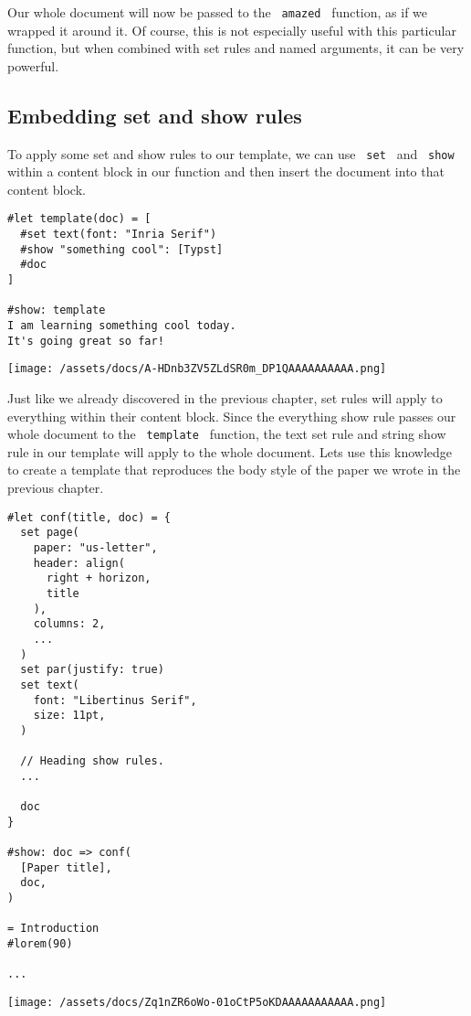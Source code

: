 Our whole document will now be passed to the \texttt{\ amazed\ }
function, as if we wrapped it around it. Of course, this is not
especially useful with this particular function, but when combined with
set rules and named arguments, it can be very powerful.

\subsection{Embedding set and show rules}\label{set-and-show-rules}

To apply some set and show rules to our template, we can use
\texttt{\ set\ } and \texttt{\ show\ } within a content block in our
function and then insert the document into that content block.

\begin{verbatim}
#let template(doc) = [
  #set text(font: "Inria Serif")
  #show "something cool": [Typst]
  #doc
]

#show: template
I am learning something cool today.
It's going great so far!
\end{verbatim}

\texttt{[image: /assets/docs/A-HDnb3ZV5ZLdSR0m\_DP1QAAAAAAAAAA.png]}

Just like we already discovered in the previous chapter, set rules will
apply to everything within their content block. Since the everything
show rule passes our whole document to the \texttt{\ template\ }
function, the text set rule and string show rule in our template will
apply to the whole document. Let\textquotesingle s use this knowledge to
create a template that reproduces the body style of the paper we wrote
in the previous chapter.

\begin{verbatim}
#let conf(title, doc) = {
  set page(
    paper: "us-letter",
    header: align(
      right + horizon,
      title
    ),
    columns: 2,
    ...
  )
  set par(justify: true)
  set text(
    font: "Libertinus Serif",
    size: 11pt,
  )

  // Heading show rules.
  ...

  doc
}

#show: doc => conf(
  [Paper title],
  doc,
)

= Introduction
#lorem(90)

...
\end{verbatim}

\texttt{[image: /assets/docs/Zq1nZR6oWo-01oCtP5oKDAAAAAAAAAAA.png]}

